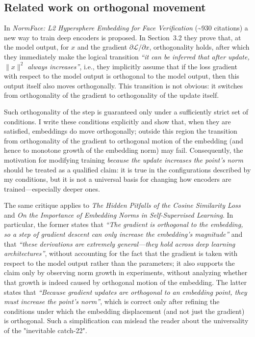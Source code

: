 \subsection{Related work on orthogonal movement}

In \emph{NormFace: L2 Hypersphere Embedding for Face Verification} (\textasciitilde930 citations) a new way to train deep encoders is proposed. In Section~3.2 they prove that, at the model output, for $x$ and the gradient $\partial\mathcal{L}/\partial x$, orthogonality holds, after which they immediately make the logical transition \emph{``it can be inferred that after update, $\|x\|^2$ always increases''}, i.e., they implicitly assume that if the loss gradient with respect to the model output is orthogonal to the model output, then this output itself also moves orthogonally. This transition is not obvious: it switches from orthogonality of the gradient to orthogonality of the update itself.

Such orthogonality of the step is guaranteed only under a sufficiently strict set of conditions. I write these conditions explicitly and show that, when they are satisfied, embeddings do move orthogonally; outside this region the transition from orthogonality of the gradient to orthogonal motion of the embedding (and hence to monotone growth of the embedding norm) may fail. Consequently, the motivation for modifying training \emph{because the update increases the point's norm} should be treated as a qualified claim: it is true in the configurations described by my conditions, but it is not a universal basis for changing how encoders are trained—especially deeper ones.

The same critique applies to \emph{The Hidden Pitfalls of the Cosine Similarity Loss} and \emph{On the Importance of Embedding Norms in Self-Supervised Learning}. In particular, the former states that \emph{``The gradient is orthogonal to the embedding, so a step of gradient descent can only increase the embedding's magnitude''} and that \emph{``these derivations are extremely general—they hold across deep learning architectures''}, without accounting for the fact that the gradient is taken with respect to the model output rather than the parameters; it also supports the claim only by observing norm growth in experiments, without analyzing whether that growth is indeed caused by orthogonal motion of the embedding. The latter states that \emph{``Because gradient updates are orthogonal to an embedding point, they must increase the point’s norm''}, which is correct only after refining the conditions under which the embedding displacement (and not just the gradient) is orthogonal. Such a simplification can mislead the reader about the universality of the "inevitable catch-22".

